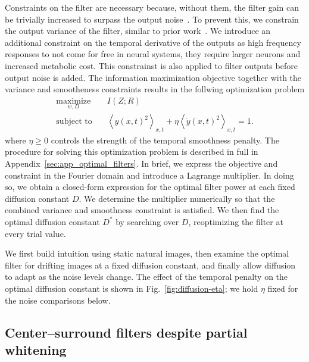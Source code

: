\documentclass[12pt]{article}
\begin{document}
Constraints on the filter are necessary because, without them, the filter gain can be trivially increased to surpass the output noise~\cite{linsker1992local}. To prevent this, we constrain the output variance of the filter, similar to prior work~\cite{linsker1992deriving,atick1992does}. We introduce an additional constraint on the temporal derivative of the outputs as high frequency responses to not come for free in neural systems, they require larger neurons and increased metabolic cost. This constrainst is also applied to filter outputs before output noise is added. The information maximization objective together with the variance and smootheness constraints results in the follwing  optimization problem
\begin{equation}
    \begin{aligned}
        \underset{w,D}{\text{maximize}} \quad & I(Z;R) \\[4pt]
        \text{subject to} \quad & \left\langle y(x,t)^2 \right\rangle_{x,t} + \eta \left\langle \dot{y}(x,t)^2 \right\rangle_{x,t} = 1.
    \end{aligned}
\end{equation}
where $\eta\ge 0$ controls the strength of the temporal smoothness penalty. The procedure for solving this optimization problem is described in full in Appendix~\ref{sec:app_optimal_filters}. In brief, we express the objective and constraint in the Fourier domain and introduce a Lagrange multiplier. In doing so, we obtain a closed-form expression for the optimal filter power at each fixed diffusion constant $D$. We determine the multiplier numerically so that the combined variance and smoothness constraint is satisfied. We then find the optimal diffusion constant $D^*$ by searching over $D$, reoptimizing the filter at every trial value.

We first build intuition using static natural images, then examine the optimal filter for drifting images at a fixed diffusion constant, and finally allow diffusion to adapt as the noise levels change. The effect of the temporal penalty on the optimal diffusion constant is shown in Fig.~\ref{fig:diffusion-eta}; we hold $\eta$ fixed for the noise comparisons below.

\subsection{Center--surround filters despite partial whitening}
\end{document}
